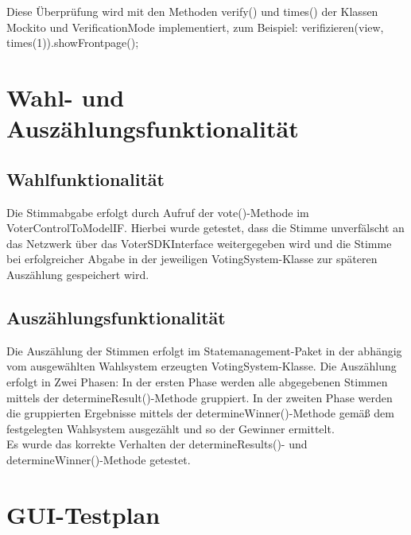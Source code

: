 \documentclass[parskip=full]{scrartcl}
\begin{document}
Diese Überprüfung wird mit den Methoden verify() und times() der Klassen Mockito und VerificationMode implementiert, zum Beispiel: 
verifizieren(view, times(1)).showFrontpage();

\section{Wahl- und Auszählungsfunktionalität}
\subsection{Wahlfunktionalität}
Die Stimmabgabe erfolgt durch Aufruf der vote()-Methode im VoterControlToModelIF.
Hierbei wurde getestet, dass die Stimme unverfälscht an das Netzwerk über das VoterSDKInterface weitergegeben wird und die Stimme bei erfolgreicher Abgabe in der jeweiligen VotingSystem-Klasse zur späteren Auszählung gespeichert wird.


\subsection{Auszählungsfunktionalität}
Die Auszählung der Stimmen erfolgt im Statemanagement-Paket in der abhängig vom ausgewählten Wahlsystem erzeugten VotingSystem-Klasse.
Die Auszählung erfolgt in Zwei Phasen: In der ersten Phase werden alle abgegebenen Stimmen mittels der determineResult()-Methode gruppiert.
In der zweiten Phase werden die gruppierten Ergebnisse mittels der determineWinner()-Methode gemäß dem festgelegten Wahlsystem ausgezählt und so der Gewinner ermittelt.\\
Es wurde das korrekte Verhalten der determineResults()- und determineWinner()-Methode getestet.

\section{GUI-Testplan}
\end{document}
